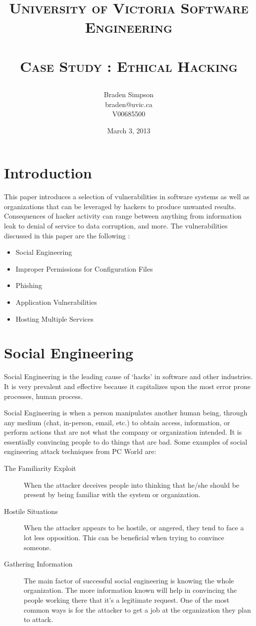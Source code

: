 \documentclass{article}
\title{
\large{\textsc{University of Victoria Software Engineering}}\huge\\ [0pt] %
\horrule{0.5pt}\\[0.4cm]
\textsc{Case Study : Ethical Hacking}\\
\author{Braden Simpson\\braden@uvic.ca\\V00685500}
\date{March 3, 2013}
}
\numberwithin{equation}{section} %
\numberwithin{figure}{section} %
\numberwithin{table}{section} %
\begin{document}
\maketitle %


\section{Introduction}
\label{sec:intro}
This paper introduces a selection of vulnerabilities in software systems as well as organizations that can be leveraged by hackers to produce unwanted results.  Consequences of hacker activity can range between anything from information leak to denial of service to data corruption, and more.  The vulnerabilities discussed in this paper are the following :

\begin{itemize}
	\item Social Engineering
	\item Improper Permissions for Configuration Files
	\item Phishing
	\item Application Vulnerabilities
	\item Hosting Multiple Services
\end{itemize}

\section{Social Engineering}
Social Engineering is the leading cause of `hacks' in software and other industries.  It is very prevalent and effective because it capitalizes upon the most error prone processes, human process.  

Social Engineering is when a person manipulates another human being, through any medium (chat, in-person, email, etc.) to obtain access, information, or perform actions that are not what the company or organization intended.  It is essentially convincing people to do things that are bad.  Some examples of social engineering attack techniques from PC World\cite{pcworld} are: 

\begin{description}
	\item[The Familiarity Exploit] When the attacker deceives people into thinking that he/she should be present by being familiar with the system or organization.
	\item[Hostile Situations] When the attacker appears to be hostile, or angered, they tend to face a lot less opposition.  This can be beneficial when trying to convince someone.
	\item[Gathering Information] The main factor of successful social engineering is knowing the whole organization.  The more information known will help in convincing the people working there that it's a legitimate request.  One of the most common ways is for the attacker to get a job at the organization they plan to attack.
\end{description}
\end{document}
